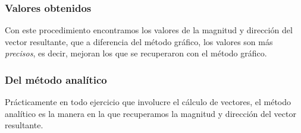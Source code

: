 \documentclass[12pt]{beamer}
\begin{document}
\begin{frame}
\frametitle{Valores obtenidos}
Con este procedimiento encontramos los valores de la magnitud y dirección del vector resultante, \pause que a diferencia del método gráfico, los valores son más \emph{precisos}, es decir, mejoran los que se recuperaron con el método gráfico.
\end{frame}
\begin{frame}
\frametitle{Del método analítico}
Prácticamente en todo ejercicio que involucre el cálculo de vectores, el método analítico es la manera en la que recuperamos la magnitud y dirección del vector resultante.
\end{frame}
\end{document}
